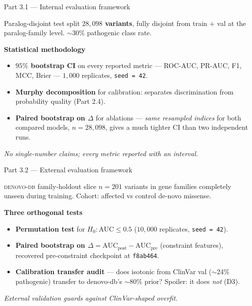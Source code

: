 \documentclass[aspectratio=169,10pt]{beamer}
\begin{document}
\begin{frame}{Part 3.1 --- Internal evaluation framework}
  \footnotesize
  \begin{block}{Paralog-disjoint test split}
    \textbf{$28{,}098$ variants}, fully disjoint from train + val at
    the paralog-family level. ${\sim}30\%$ pathogenic class rate.
  \end{block}

  \vspace{0.4em}
  \textbf{\textcolor{kkuGreen}{Statistical methodology}}
  \begin{itemize}\setlength{\itemsep}{0.25em}
    \item \textbf{$95\%$ bootstrap CI} on every reported metric ---
          ROC-AUC, PR-AUC, F1, MCC, Brier --- $1{,}000$ replicates,
          \texttt{seed = 42}.
    \item \textbf{Murphy decomposition} for calibration: separates
          discrimination from probability quality (Part 2.4).
    \item \textbf{Paired bootstrap on $\Delta$} for ablations ---
          \emph{same resampled indices} for both compared models,
          $n=28{,}098$, gives a much tighter CI than two independent
          runs.
  \end{itemize}

  \vspace{0.3em}
  \scriptsize
  \emph{No single-number claims; every metric reported with an interval.}
\end{frame}

\begin{frame}{Part 3.2 --- External evaluation framework}
  \footnotesize
  \begin{block}{\textsc{denovo-db} family-holdout slice}
    \textbf{$n = 201$} variants in gene families completely unseen
    during training. Cohort: affected vs control de-novo missense.
  \end{block}

  \vspace{0.4em}
  \textbf{\textcolor{kkuGreen}{Three orthogonal tests}}
  \begin{itemize}\setlength{\itemsep}{0.25em}
    \item \textbf{Permutation test} for $H_0\!: \text{AUC} \le 0.5$
          ($10{,}000$ replicates, \texttt{seed = 42}).
    \item \textbf{Paired bootstrap on
          $\Delta = \text{AUC}_{\text{post}} - \text{AUC}_{\text{pre}}$}
          (constraint features), recovered pre-constraint checkpoint
          at \texttt{f8ab464}.
    \item \textbf{Calibration transfer audit} --- does isotonic from
          ClinVar val ($\sim$24\% pathogenic) transfer to denovo-db's
          $\sim$80\% prior? Spoiler: it does \emph{not} (D3).
  \end{itemize}

  \vspace{0.3em}
  \scriptsize
  \emph{External validation guards against ClinVar-shaped overfit.}
\end{frame}
\end{document}

